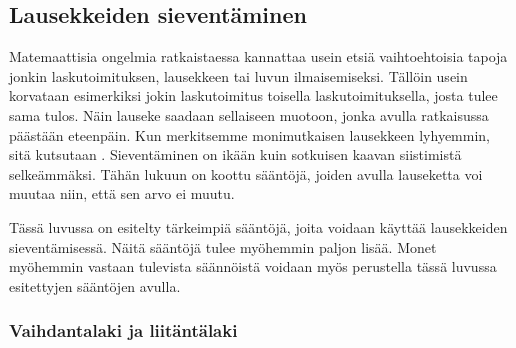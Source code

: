 %
%
%

\subsection*{Lausekkeiden sieventäminen}

Matemaattisia ongelmia ratkaistaessa kannattaa usein etsiä vaihtoehtoisia tapoja jonkin laskutoimituksen, lausekkeen tai luvun ilmaisemiseksi. Tällöin usein korvataan esimerkiksi jokin laskutoimitus toisella laskutoimituksella, josta tulee sama tulos. Näin lauseke saadaan sellaiseen muotoon, jonka avulla ratkaisussa päästään eteenpäin. Kun merkitsemme monimutkaisen lausekkeen lyhyemmin, sitä kutsutaan . Sieventäminen on ikään kuin sotkuisen kaavan siistimistä selkeämmäksi. Tähän lukuun on koottu sääntöjä, joiden avulla lauseketta voi muutaa niin, että sen arvo ei muutu.

Tässä luvussa on esitelty tärkeimpiä sääntöjä, joita voidaan käyttää lausekkeiden sieventämisessä. Näitä sääntöjä tulee myöhemmin paljon lisää. Monet myöhemmin vastaan tulevista säännöistä voidaan myös perustella tässä luvussa esitettyjen sääntöjen avulla.

\subsubsection*{Vaihdantalaki ja liitäntälaki}


